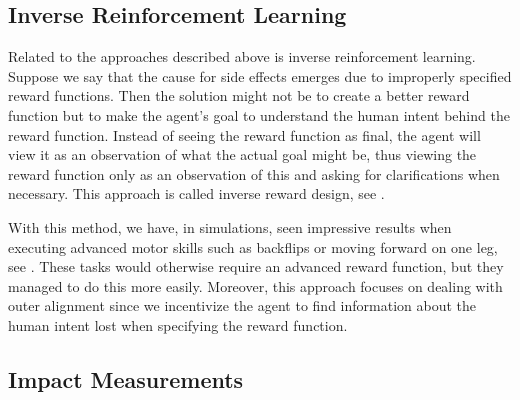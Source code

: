 \documentclass[12pt,A4]{report}
\theoremstyle{definition}
\begin{document}
\subsection{Inverse Reinforcement Learning}
Related to the approaches described above is inverse reinforcement learning. Suppose we say that the cause for side effects emerges due to improperly specified reward functions. Then the solution might not be to create a better reward function but to make the agent's goal to understand the human intent behind the reward function. Instead of seeing the reward function as final, the agent will view it as an observation of what the actual goal might be, thus viewing the reward function only as an observation of this and asking for clarifications when necessary. This approach is called inverse reward design, see \citet{Hadfield-Menell2}.

With this method, we have, in simulations, seen impressive results when executing advanced motor skills such as backflips or moving forward on one leg, see \citet{Christiano}. These tasks would otherwise require an advanced reward function, but they managed to do this more easily. Moreover, this approach focuses on dealing with outer alignment since we incentivize the agent to find information about the human intent lost when specifying the reward function. 


\subsection{Impact Measurements}
\end{document}
